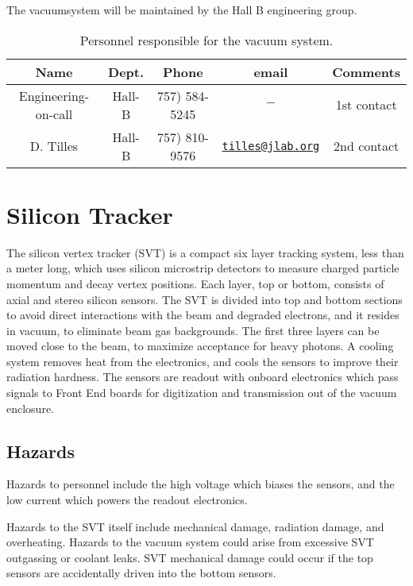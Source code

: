 \documentclass[11pt]{report}
\begin{document}
\indent

The vacuumsystem will be maintained by the Hall B engineering group.  

 \begin{table}[!htb]
 \centering
 \begin{tabular}{|c|c|c|c|c|}
\hline
 Name&Dept.&Phone&email&Comments \\ \hline
 Engineering-on-call & Hall-B&757) 584-5245&$-$& 1st contact  \\ \hline
 D. Tilles & Hall-B&757) 810-9576&\href{mailto:tilles@jlab.org}{\nolinkurl{tilles@jlab.org}}&2nd contact \\ \hline
 \end{tabular}
\caption{Personnel responsible for the vacuum system.} 
\label{tb:vacuum}
\end{table}


\section{Silicon Tracker}
\indent

The silicon vertex tracker (SVT) is a compact six layer tracking system, less than a meter long, which uses silicon microstrip detectors to measure charged particle momentum and decay vertex positions. Each layer, top or bottom, consists of axial and stereo silicon sensors. The SVT  is divided into top and bottom sections  to avoid direct interactions with the beam and degraded electrons, and it resides in vacuum, to eliminate beam gas backgrounds. The first three layers can be moved close to the beam, to maximize acceptance for heavy photons. A cooling system removes heat from the electronics, and cools the sensors to improve their radiation hardness.  The sensors are readout with onboard electronics which pass signals to Front End boards for digitization and transmission out of the vacuum enclosure.

\subsection{Hazards} 
\indent

Hazards to personnel include the high voltage which biases the sensors, and the low current which powers the readout electronics.

Hazards to the SVT itself include mechanical damage, radiation damage, and overheating. Hazards to the vacuum system could arise from excessive SVT outgassing or coolant leaks.
SVT mechanical damage could occur if the top sensors are accidentally driven into the bottom sensors.
\end{document}
